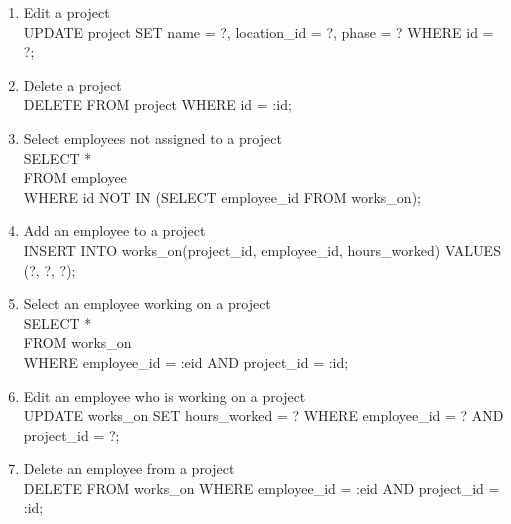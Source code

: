 \documentclass[fleqn, 11pt,letterpaper]{article}
\begin{document}
\begin{enumerate}
		\item Edit a project \\UPDATE project SET name = ?, location\_id = ?, phase = ? WHERE id = ?; 
		\item Delete a project \\DELETE FROM project WHERE id = :id;
		\item Select employees not assigned to a project \\SELECT * \\FROM employee \\WHERE id NOT IN (SELECT employee\_id FROM works\_on);
		\item Add an employee to a project \\INSERT INTO works\_on(project\_id, employee\_id, hours\_worked) VALUES (?, ?, ?);
		\item Select an employee working on a project \\SELECT * \\FROM works\_on \\WHERE employee\_id = :eid AND project\_id = :id;
		\item Edit an employee who is working on a project \\UPDATE works\_on SET hours\_worked = ? WHERE employee\_id = ? AND project\_id = ?; 
		\item Delete an employee from a project \\DELETE FROM works\_on WHERE employee\_id = :eid AND project\_id = :id;
	\end{enumerate}
\end{document}

